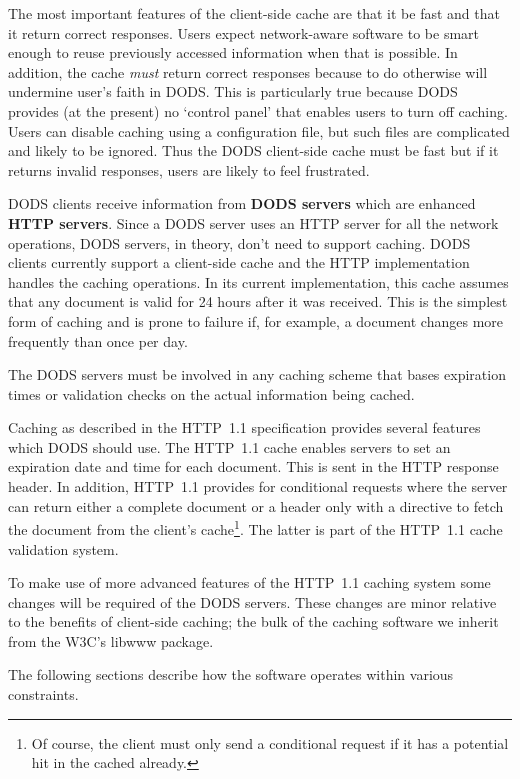 \documentclass{article}
\begin{document}
The most important features of the client-side cache are that it be fast and
that it return correct responses. Users expect network-aware software to be
smart enough to reuse previously accessed information when that is possible.
In addition, the cache \emph{must} return correct responses because to do
otherwise will undermine user's faith in DODS. This is particularly true
because DODS provides (at the present) no `control panel' that enables users
to turn off caching. Users can disable caching using a configuration file,
but such files are complicated and likely to be ignored. Thus the DODS
client-side cache must be fast but if it returns invalid responses, users are
likely to feel frustrated.

DODS clients receive information from \textbf{DODS
  servers} which are enhanced \textbf{HTTP
  servers}.  Since a DODS server uses an HTTP server
for all the network operations, DODS servers, in theory, don't need to
support caching.  DODS clients currently support a client-side cache and the
HTTP implementation handles the caching operations. In its current
implementation, this cache assumes that any document is valid for 24 hours
after it was received. This is the simplest form of caching and is prone to
failure if, for example, a document changes more frequently than once per
day.

The DODS servers must be involved in any caching scheme that bases
expiration times or validation checks on the actual information being cached.

Caching as described in the HTTP~1.1 specification provides several features
which DODS should use. The HTTP~1.1 cache enables servers to set an
expiration date and time for each document. This is sent in the HTTP response
header. In addition, HTTP~1.1 provides for conditional requests where the
server can return either a complete document or a header only with a
directive to fetch the document from the client's cache\footnote{Of course,
  the client must only send a conditional request if it has a potential hit
  in the cached already.}. The latter is part of the HTTP~1.1 cache
validation system.

To make use of more advanced features of the HTTP~1.1 caching system some
changes will be required of the DODS servers. These changes are minor
relative to the benefits of client-side caching; the bulk of the caching
software we inherit from the \acs{W3C}'s libwww package.

The following sections describe how the software operates within various
constraints.
\end{document}

